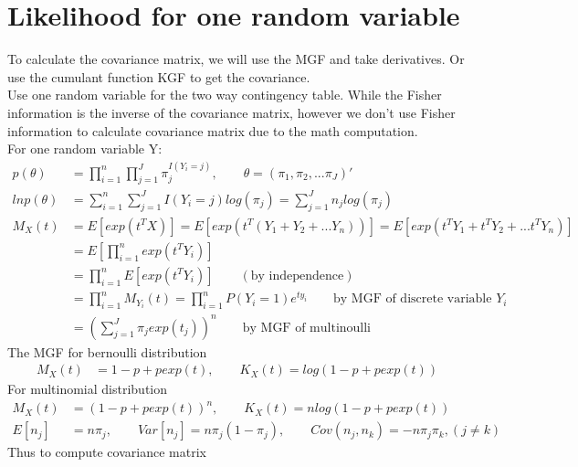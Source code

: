 \documentclass[11pt]{article} %
\begin{document}
	



	
	\section{Likelihood for one random variable}
	To calculate the covariance matrix, we will use the MGF and take derivatives. Or use the cumulant function KGF to get the covariance.\\
	Use one random variable for the two way contingency table. While the Fisher information is the inverse of the covariance matrix, however we don't use Fisher information to calculate covariance matrix due to the math computation.\\
	For one random variable Y:
	\begin{align*}
		p(\theta) &= \prod_{i=1}^n \prod_{j=1}^J \pi_{j}^{I(Y_{i} = j)}, \qquad \theta = (\pi_1, \pi_2, ... \pi_J)'\\
		ln p(\theta) &= \sum_{i=1}^n \sum_{j=1}^J I(Y_{i}=j)log( \pi_{j}) = \sum_{j=1}^J n_j log(\pi_{j})\\
		M_X(t) &= E[exp(t^TX)] = E[exp(t^T(Y_1 + Y_2 +... Y_n))] = E[exp(t^TY_1 + t^TY_2 + ... t^TY_n)]\\
		&= E[\prod_{i=1}^n exp(t^TY_i)]\\
		&= \prod_{i=1}^n E[exp(t^TY_i)]  \qquad (\text{by independence})\\
		&= \prod_{i=1}^n M_{Y_i}(t) = \prod_{i=1}^n P(Y_i= 1) e^{ty_i}\qquad  \text{by MGF of discrete variable $Y_i$}\\
		&= \left( \sum_{j=1}^J \pi_j exp(t_j)\right)^n \qquad \text{by MGF of multinoulli}
	\end{align*}
	The MGF for bernoulli distribution
	\begin{align*}
		M_X(t) &= 1-p + p exp(t), \qquad K_X(t) = log (1-p + p exp(t))
	\end{align*}
	For multinomial distribution
	\begin{align*}
		M_X(t) &= (1-p + p exp(t))^n, \qquad K_X(t) = n log (1-p + p exp(t))\\
		E[n_j] &= n\pi_j, \qquad Var[n_j] = n\pi_j(1-\pi_j), \qquad Cov(n_j, n_k) = -n\pi_j\pi_k, {(j \neq k)}
	\end{align*}    
	Thus to compute covariance matrix
\end{document}
